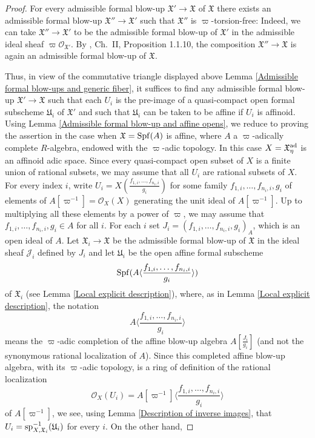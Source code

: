 \documentclass[12pt,twoside,a4paper]{article}
\theoremstyle{definition}
\theoremstyle{remark}
\newcommand\ad{{\rm ad}}
\newcommand\spc{{\rm sp}}
\newcommand\Spf{{\rm Spf}}
\begin{document}
\begin{proof}For every admissible formal blow-up $\mathfrak{X}'\to\mathfrak{X}$ of $\mathfrak{X}$ there exists an admissible formal blow-up $\mathfrak{X}''\to \mathfrak{X}'$ such that $\mathfrak{X}''$ is $\varpi$-torsion-free: Indeed, we can take $\mathfrak{X}''\to\mathfrak{X}'$ to be the admissible formal blow-up of $\mathfrak{X}'$ in the admissible ideal sheaf $\varpi\mathcal{O}_{\mathfrak{X}'}$. By \cite{FK}, Ch.~II, Proposition 1.1.10, the composition $\mathfrak{X}''\to\mathfrak{X}$ is again an admissible formal blow-up of $\mathfrak{X}$. 

Thus, in view of the commutative triangle displayed above Lemma \ref{Admissible formal blow-ups and generic fiber}, it suffices to find any admissible formal blow-up $\mathfrak{X}'\to\mathfrak{X}$ such that each $U_{i}$ is the pre-image of a quasi-compact open formal subscheme $\mathfrak{U}_{i}$ of $\mathfrak{X}'$ and such that $\mathfrak{U}_{i}$ can be taken to be affine if $U_i$ is affinoid. Using Lemma \ref{Admissible formal blow-up and affine opens}, we reduce to proving the assertion in the case when $\mathfrak{X}=\Spf(A)$ is affine, where $A$ a $\varpi$-adically complete $R$-algebra, endowed with the $\varpi$-adic topology. In this case $X=\mathfrak{X}_{\eta}^{\ad}$ is an affinoid adic space. Since every quasi-compact open subset of $X$ is a finite union of rational subsets, we may assume that all $U_{i}$ are rational subsets of $X$. For every index $i$, write $U_{i}=X(\frac{f_{1,i},\dots, f_{n_{i}, i}}{g_{i}})$ for some family $f_{1,i}, \dots, f_{n_{i},i}, g_{i}$ of elements of $A[\varpi^{-1}]=\mathcal{O}_{X}(X)$ generating the unit ideal of $A[\varpi^{-1}]$. Up to multiplying all these elements by a power of $\varpi$, we may assume that $f_{1,i}, \dots, f_{n_{i},i}, g_{i}\in A$ for all $i$. For each $i$ set $J_{i}=(f_{1,i}, \dots, f_{n_{i},i}, g_{i})_{A}$, which is an open ideal of $A$. Let $\mathfrak{X}_{i}\to \mathfrak{X}$ be the admissible formal blow-up of $\mathfrak{X}$ in the ideal sheaf $\mathcal{J}_{i}$ defined by $J_{i}$ and let $\mathfrak{U}_{i}$ be the open affine formal subscheme \begin{equation*}\Spf(A\langle\frac{f_{1,i},\dots, f_{n_{i},i}}{g_{i}}\rangle)\end{equation*}of $\mathfrak{X}_{i}$ (see Lemma \ref{Local explicit description}), where, as in Lemma \ref{Local explicit description}, the notation \begin{equation*}A\langle\frac{f_{1,i},\dots, f_{n_{i},i}}{g_{i}}\rangle\end{equation*}means the $\varpi$-adic completion of the affine blow-up algebra $A[\frac{J_{i}}{g_{i}}]$ (and not the synonymous rational localization of $A$). Since this completed affine blow-up algebra, with its $\varpi$-adic topology, is a ring of definition of the rational localization \begin{equation*}\mathcal{O}_{X}(U_{i})=A[\varpi^{-1}]\langle\frac{f_{1,i},\dots, f_{n_{i},i}}{g_{i}}\rangle\end{equation*}of $A[\varpi^{-1}]$, we see, using Lemma \ref{Description of inverse images}, that $U_{i}=\spc_{X,\mathfrak{X}_{i}}^{-1}(\mathfrak{U}_{i})$ for every $i$. On the other hand, 
\end{proof}
\end{document}
